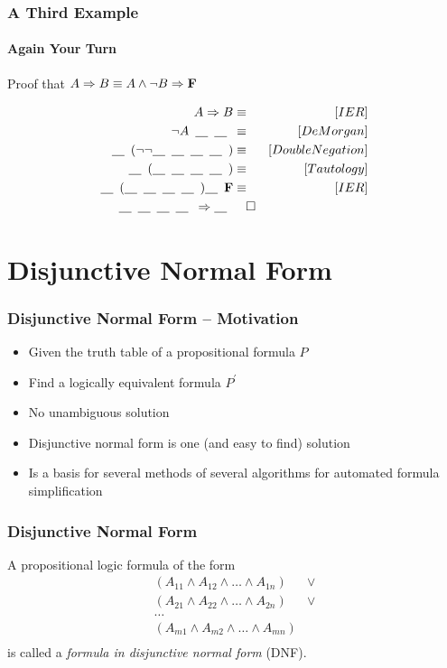 \documentclass{beamer}
\theoremstyle{remark}
\begin{document}
\begin{frame}
	\frametitle{A Third Example}
	\framesubtitle{Again Your Turn}
	Proof that $A \Rightarrow B \equiv A \land \lnot B \Rightarrow \text{{\bf F}}$

	\newcommand{\ph}{\underline{\hspace{1em}}\hspace{.5em}}

	\begin{align}
		A \Rightarrow B & \equiv & [IER] \\
		\lnot A \hspace{.5em} \ph \ph & \equiv & [DeMorgan] \\
		\ph(\lnot\lnot\ph\ph\ph\ph) & \equiv & [Double Negation] \\
		\ph(\ph \ph \ph \ph) & \equiv & [Tautology]\\
		\ph(\ph \ph \ph \ph) \ph \text{{\bf F}} & \equiv & [IER] \\
		\ph \ph \ph \ph \Rightarrow \ph & \hspace{1em}\square
	\end{align}

\end{frame}

\section{Disjunctive Normal Form}
\begin{frame}
	\frametitle{Disjunctive Normal Form -- Motivation}
	\begin{itemize}
	\item Given the truth table of a propositional formula $P$
	\item Find a logically equivalent formula $P^{\prime}$
	\pause
	\item No unambiguous solution
	\pause
	\item Disjunctive normal form is one (and easy to find) solution
	\pause
	\item Is a basis for several methods of several algorithms for automated formula simplification
\end{itemize}

\end{frame}

\begin{frame}
	\frametitle{Disjunctive Normal Form}
	\begin{definition}
	A propositional logic formula of the form
	\begin{align*}
		(A_{11} \land A_{12} \land \ldots \land A_{1n}) & \lor \\
		(A_{21} \land A_{22} \land \ldots \land A_{2n}) & \lor \\
		\ldots \\
		(A_{m1} \land A_{m2} \land \ldots \land A_{mn}) & \\
	\end{align*}
	is called a {\em formula in disjunctive normal form} (DNF).
\end{definition}

\end{frame}
\end{document}
